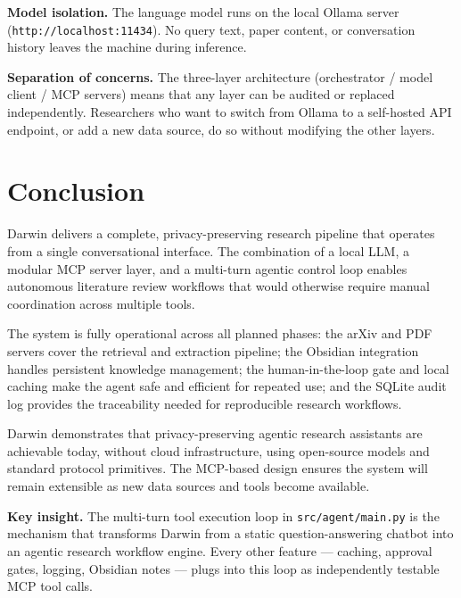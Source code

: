 \documentclass[12pt, a4paper]{article}
\newcommand{\code}[1]{\texttt{\small\color{darwinblue}#1}}
\begin{document}
\begin{infobox}
\textbf{Model isolation.} The language model runs on the local Ollama server (\texttt{http://localhost:11434}). No query text, paper content, or conversation history leaves the machine during inference.
\end{infobox}

\begin{infobox}
\textbf{Separation of concerns.} The three-layer architecture (orchestrator / model client / MCP servers) means that any layer can be audited or replaced independently. Researchers who want to switch from Ollama to a self-hosted API endpoint, or add a new data source, do so without modifying the other layers.
\end{infobox}

\section{Conclusion}

Darwin delivers a complete, privacy-preserving research pipeline that operates from a single conversational interface. The combination of a local LLM, a modular MCP server layer, and a multi-turn agentic control loop enables autonomous literature review workflows that would otherwise require manual coordination across multiple tools.

The system is fully operational across all planned phases: the arXiv and PDF servers cover the retrieval and extraction pipeline; the Obsidian integration handles persistent knowledge management; the human-in-the-loop gate and local caching make the agent safe and efficient for repeated use; and the SQLite audit log provides the traceability needed for reproducible research workflows.

Darwin demonstrates that privacy-preserving agentic research assistants are achievable today, without cloud infrastructure, using open-source models and standard protocol primitives. The MCP-based design ensures the system will remain extensible as new data sources and tools become available.

\vspace{1.5em}
\begin{mdframed}[
    backgroundcolor = darwinlight,
    linecolor       = darwinblue,
    linewidth       = 1.5pt,
    innerleftmargin = 14pt,
    innerrightmargin= 14pt,
    innertopmargin  = 10pt,
    innerbottommargin= 10pt,
]
\textbf{Key insight.} The multi-turn tool execution loop in \code{src/agent/main.py} is the mechanism that transforms Darwin from a static question-answering chatbot into an agentic research workflow engine. Every other feature --- caching, approval gates, logging, Obsidian notes --- plugs into this loop as independently testable MCP tool calls.
\end{mdframed}
\end{document}
